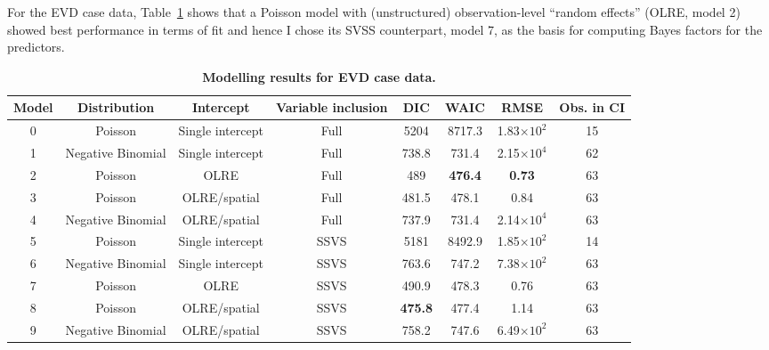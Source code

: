 For the EVD case data, Table~\ref{tab:casesModels} shows that a Poisson model with (unstructured) observation-level ``random effects'' (OLRE, model 2) showed best performance in terms of fit and hence I chose its SVSS counterpart, model 7, as the basis for computing Bayes factors for the predictors.

\begin{minipage}{\textwidth}    
\setcounter{mpfootnote}{\value{footnote}}
\renewcommand{\thempfootnote}{\arabic{mpfootnote}}
\fontsize{9}{10}\selectfont
{}
\begin{longtable}{cccccccc}
\caption{\textbf{Modelling results for EVD case data.}
}
\label{tab:casesModels}\\
\toprule
Model & Distribution & Intercept& Variable inclusion & DIC  & WAIC   & RMSE\footnotemark[1] & Obs. in CI\footnotemark[2]\\
\toprule
0  & Poisson & Single intercept & Full & 5204  & 8717.3 & 1.83$\times 10^2$ & 15\\
\hline
1   & Negative Binomial & Single intercept & Full & 738.8 & 731.4  & 2.15$\times 10^4$& 62\\
\hline
2 & Poisson & OLRE & Full & 489   & \textbf{476.4} & \textbf{0.73} & 63\\
\hline
3 & Poisson & OLRE/spatial\footnotemark[3] & Full & 481.5 & 478.1  & 0.84 & 63 \\
\hline
4 & Negative Binomial & OLRE/spatial\footnotemark[4] & Full & 737.9 & 731.4 & 2.14$\times 10^4$ & 63\\
\hline
5 & Poisson  & Single intercept & SSVS & 5181  & 8492.9 & 1.85$\times 10^2$ & 14\\
\hline
6 & Negative Binomial & Single intercept & SSVS & 763.6 & 747.2  & 7.38$\times 10^2$& 63\\
\hline
7 & Poisson & OLRE & SSVS & 490.9 & 478.3  & 0.76   & 63\\
\hline
8 & Poisson & OLRE/spatial\footnotemark[3] & SSVS & \textbf{475.8} & 477.4  & 1.14 & 63\\
\hline
9 & Negative Binomial & OLRE/spatial\footnotemark[4]& SSVS & 758.2 & 747.6 & 6.49$\times 10^2$ & 63\\
\bottomrule
\end{longtable}
\setcounter{footnote}{\value{mpfootnote}}
\end{minipage}

